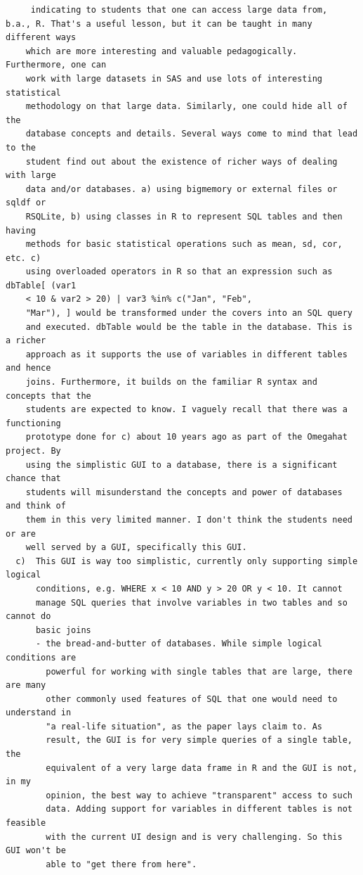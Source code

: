 \documentclass[11pt]{tise_style}
\begin{document}
\begin{verbatim}
     indicating to students that one can access large data from,
b.a., R. That's a useful lesson, but it can be taught in many different ways
    which are more interesting and valuable pedagogically. Furthermore, one can
    work with large datasets in SAS and use lots of interesting statistical
    methodology on that large data. Similarly, one could hide all of the
    database concepts and details. Several ways come to mind that lead to the
    student find out about the existence of richer ways of dealing with large
    data and/or databases. a) using bigmemory or external files or sqldf or
    RSQLite, b) using classes in R to represent SQL tables and then having
    methods for basic statistical operations such as mean, sd, cor, etc. c)
    using overloaded operators in R so that an expression such as dbTable[ (var1
    < 10 & var2 > 20) | var3 %in% c("Jan", "Feb",
    "Mar"), ] would be transformed under the covers into an SQL query
    and executed. dbTable would be the table in the database. This is a richer
    approach as it supports the use of variables in different tables and hence
    joins. Furthermore, it builds on the familiar R syntax and concepts that the
    students are expected to know. I vaguely recall that there was a functioning
    prototype done for c) about 10 years ago as part of the Omegahat project. By
    using the simplistic GUI to a database, there is a significant chance that
    students will misunderstand the concepts and power of databases and think of
    them in this very limited manner. I don't think the students need or are
    well served by a GUI, specifically this GUI.
  c)  This GUI is way too simplistic, currently only supporting simple logical
      conditions, e.g. WHERE x < 10 AND y > 20 OR y < 10. It cannot
      manage SQL queries that involve variables in two tables and so cannot do
      basic joins
      - the bread-and-butter of databases. While simple logical conditions are
        powerful for working with single tables that are large, there are many
        other commonly used features of SQL that one would need to understand in
        "a real-life situation", as the paper lays claim to. As
        result, the GUI is for very simple queries of a single table, the
        equivalent of a very large data frame in R and the GUI is not, in my
        opinion, the best way to achieve "transparent" access to such
        data. Adding support for variables in different tables is not feasible
        with the current UI design and is very challenging. So this GUI won't be
        able to "get there from here".

\end{verbatim}
\end{document}
